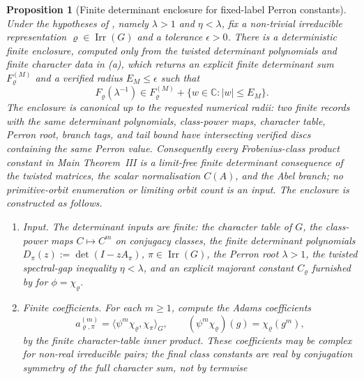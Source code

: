\documentclass[11pt,a4paper]{amsart}
\theoremstyle{plain}
\newtheorem{proposition}[theorem]{Proposition}
\theoremstyle{definition}
\theoremstyle{remark}
\DeclareMathOperator{\Irr}{Irr}
\newcommand{\CC}{\mathbb{C}}
\begin{document}
\begin{proposition}[Finite determinant enclosure for fixed-label Perron constants]
  \label{prop:fixed-label-perron-finite-algorithm}
  Under the hypotheses of , namely
  \(\lambda>1\) and \(\eta<\lambda\), fix a
  non-trivial irreducible representation \(\varrho\in\Irr(G)\) and a tolerance
  \(\epsilon>0\).  There is a deterministic finite enclosure, computed only
  from the twisted determinant polynomials and finite character data in
  \textup{(a)}, which returns an explicit finite determinant sum \(F_\varrho^{(M)}\) and
  a verified radius \(E_M\le\epsilon\) such that
  \[
    F_\varrho(\lambda^{-1})
    \in F_\varrho^{(M)}+\{w\in\CC:|w|\le E_M\}.
  \]
  The enclosure is canonical up to the requested numerical radii: two finite
  records with the same determinant polynomials, class-power maps, character
  table, Perron root, branch tags, and tail bound have intersecting verified
  discs containing the same Perron value.  Consequently every
  Frobenius-class product constant in Main Theorem~III is a limit-free finite
  determinant consequence of the twisted matrices, the scalar normalisation
  \(C(A)\), and the Abel branch; no primitive-orbit enumeration or limiting
  orbit count is an input.  The enclosure is constructed as follows.
  \begin{enumerate}[label=\textup{(\alph*)},leftmargin=*]
    \item \emph{Input.}  The determinant inputs are finite: the character table of \(G\),
      the class-power maps \(C\mapsto C^m\) on conjugacy classes, the finite
      determinant polynomials \(D_\pi(z):=\det(I-zA_\pi)\),
      \(\pi\in\Irr(G)\), the Perron root \(\lambda>1\), the twisted
      spectral-gap inequality \(\eta<\lambda\), and an explicit majorant
      constant \(C_\varrho\) furnished by
       for
      \(\phi=\chi_\varrho\).
    \item \emph{Finite coefficients.}  For each \(m\ge1\), compute the Adams coefficients
      \begin{equation}\label{eq:fixed-label-algorithm-adams-coefficients}
        a_{\varrho,\pi}^{(m)}
        =\bigl\langle \psi^m\chi_\varrho,\chi_\pi\bigr\rangle_G,
        \qquad
        (\psi^m\chi_\varrho)(g)=\chi_\varrho(g^m),
      \end{equation}
      by the finite character-table inner product.  These coefficients may be
      complex for non-real irreducible pairs; the final class constants are
      real by conjugation symmetry of the full character sum, not by termwise

\end{enumerate}
\end{proposition}
\end{document}
